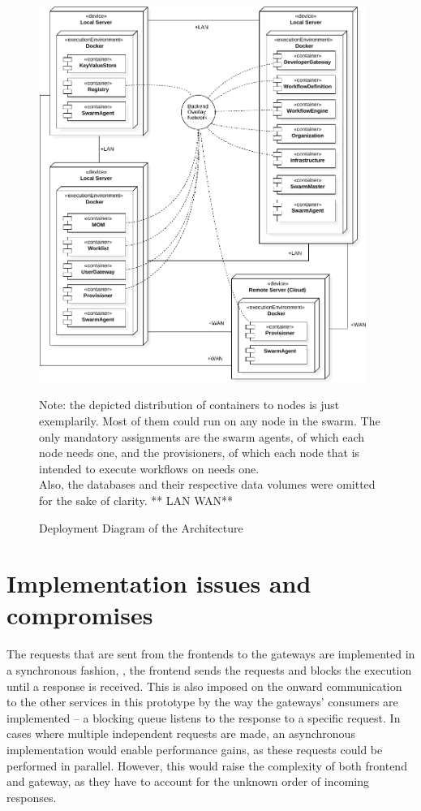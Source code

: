   \begin{figure}[htbp]
    \centering
    \includegraphics[width=0.95\textwidth]{content/images/Architecture-crop.pdf}
    \caption*{\scriptsize Note: the depicted distribution of containers to nodes is just exemplarily. Most of them could run on any node in the swarm. The only mandatory assignments are the swarm agents, of which each node needs one, and the provisioners, of which each node that is intended to execute workflows on needs one. \\ Also, the databases and their respective data volumes were omitted for the sake of clarity. ** LAN WAN**}
    \caption{Deployment Diagram of the Architecture}
    \label{fig:deployment_diagram_of_the_architecture}
  \end{figure}

\section{Implementation issues and compromises} %
  \label{sec:implementation_issues}
  The requests that are sent from the frontends to the gateways are implemented in a synchronous fashion, \ie, the frontend sends the requests and blocks the execution until a response is received. This is also imposed on the onward communication to the other services in this prototype by the way the gateways' consumers are implemented -- a blocking queue listens to the response to a specific request. In cases where multiple independent requests are made, an asynchronous implementation would enable performance gains, as these requests could be performed in parallel. However, this would raise the complexity of both frontend and gateway, as they have to account for the unknown order of incoming responses.

